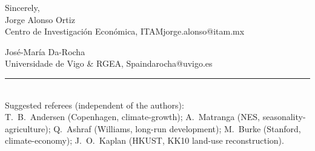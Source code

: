 \documentclass[11pt,letterpaper]{article}
\begin{document}
\bigskip

\noindent Sincerely,\\[0.4em]
Jorge Alonso Ortiz \\
\small\textcolor{mutedgray}{Centro de Investigaci\'on Econ\'omica, ITAM\quad\textbar\quad jorge.alonso@itam.mx}

\bigskip

\noindent Jos\'e-Mar\'ia Da-Rocha \\
\small\textcolor{mutedgray}{Universidade de Vigo \& RGEA, Spain\quad\textbar\quad darocha@uvigo.es}

\bigskip

\textcolor{mutedgray}{\rule{0.22\linewidth}{0.4pt}}\\[0.2em]
{\footnotesize\textcolor{mutedgray}{Suggested referees (independent of the authors):}\\
T.\ B.\ Andersen (Copenhagen, climate-growth);
A.\ Matranga (NES, seasonality-agriculture);
Q.\ Ashraf (Williams, long-run development);
M.\ Burke (Stanford, climate-economy);
J.\ O.\ Kaplan (HKUST, KK10 land-use reconstruction).}
\end{document}
